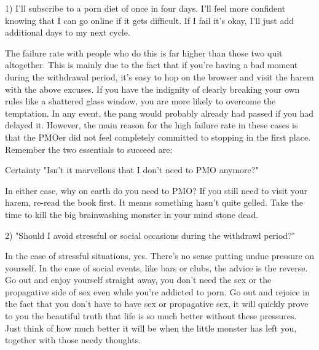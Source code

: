   1) I'll subscribe to a porn diet of once in four days. I'll feel more confident knowing that I can go online if it gets difficult. If I fail it's okay, I'll just add additional days to my next cycle.

The failure rate with people who do this is far higher than those two quit altogether. This is mainly due to the fact that if you're having a bad moment during the withdrawal period, it's easy to hop on the browser and visit the harem with the above excuses. If you have the indignity of clearly breaking your own rules like a shattered glass window, you are more likely to overcome the temptation. In any event, the pang would probably already had passed if you had delayed it. However, the main reason for the high failure rate in these cases is that the PMOer did not feel completely committed to stopping in the first place. Remember the two essentials to succeed are:

  Certainty
  "Isn't it marvellous that I don't need to PMO anymore?"

In either case, why on earth do you need to PMO? If you still need to visit your harem, re-read the book first. It means something hasn't quite gelled. Take the time to kill the big brainwashing monster in your mind stone dead.

  2) "Should I avoid stressful or social occasions during the withdrawl period?" 

In the case of stressful situations, yes. There's no sense putting undue pressure on yourself. In the case of social events, like bars or clubs, the advice is the reverse. Go out and enjoy yourself straight away, you don't need the sex or the propagative side of sex even while you're addicted to porn. Go out and rejoice in the fact that you don't have to have sex or propagative sex, it will quickly prove to you the beautiful truth that life is so much better without these pressures. Just think of how much better it will be when the little monster has left you, together with those needy thoughts.
